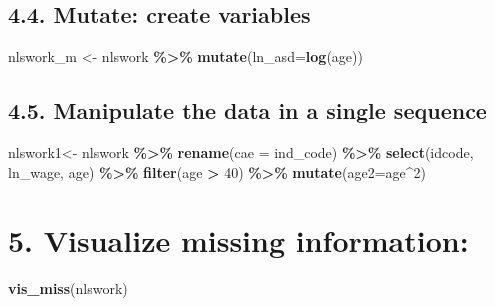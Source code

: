 \documentclass[
]{article}
\newenvironment{Shaded}{\begin{snugshade}}{\end{snugshade}}
\newcommand{\AttributeTok}[1]{\textcolor[rgb]{0.13,0.29,0.53}{#1}}
\newcommand{\DecValTok}[1]{\textcolor[rgb]{0.00,0.00,0.81}{#1}}
\newcommand{\FunctionTok}[1]{\textcolor[rgb]{0.13,0.29,0.53}{\textbf{#1}}}
\newcommand{\NormalTok}[1]{#1}
\newcommand{\OtherTok}[1]{\textcolor[rgb]{0.56,0.35,0.01}{#1}}
\newcommand{\SpecialCharTok}[1]{\textcolor[rgb]{0.81,0.36,0.00}{\textbf{#1}}}
\begin{document}
\hypertarget{mutate-create-variables}{%
\subsection{4.4. Mutate: create
variables}\label{mutate-create-variables}}

\begin{Shaded}
\begin{Highlighting}[]
\NormalTok{ nlswork\_m }\OtherTok{\textless{}{-}}\NormalTok{ nlswork }\SpecialCharTok{\%\textgreater{}\%} 
  \FunctionTok{mutate}\NormalTok{(}\AttributeTok{ln\_asd=}\FunctionTok{log}\NormalTok{(age))}
\end{Highlighting}
\end{Shaded}

\hypertarget{manipulate-the-data-in-a-single-sequence}{%
\subsection{4.5. Manipulate the data in a single
sequence}\label{manipulate-the-data-in-a-single-sequence}}

\begin{Shaded}
\begin{Highlighting}[]
\NormalTok{nlswork1}\OtherTok{\textless{}{-}}\NormalTok{ nlswork }\SpecialCharTok{\%\textgreater{}\%} 
  \FunctionTok{rename}\NormalTok{(}\AttributeTok{cae =}\NormalTok{ ind\_code) }\SpecialCharTok{\%\textgreater{}\%}
  \FunctionTok{select}\NormalTok{(idcode, ln\_wage, age) }\SpecialCharTok{\%\textgreater{}\%} 
  \FunctionTok{filter}\NormalTok{(age }\SpecialCharTok{\textgreater{}} \DecValTok{40}\NormalTok{) }\SpecialCharTok{\%\textgreater{}\%}
  \FunctionTok{mutate}\NormalTok{(}\AttributeTok{age2=}\NormalTok{age}\SpecialCharTok{\^{}}\DecValTok{2}\NormalTok{)}
\end{Highlighting}
\end{Shaded}

\hypertarget{visualize-missing-information}{%
\section{5. Visualize missing
information:}\label{visualize-missing-information}}

\begin{Shaded}
\begin{Highlighting}[]
\FunctionTok{vis\_miss}\NormalTok{(nlswork)}
\end{Highlighting}
\end{Shaded}
\end{document}
